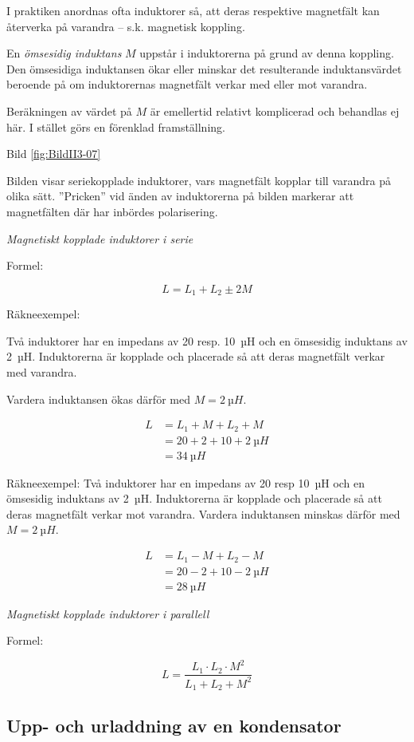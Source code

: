 I praktiken anordnas ofta induktorer så, att deras respektive magnetfält kan
återverka på varandra -- s.k. magnetisk koppling.

En \emph{ömsesidig induktans} \(M\) uppstår i induktorerna på grund av denna
koppling. Den ömsesidiga induktansen ökar eller minskar det resulterande
induktansvärdet beroende på om induktorernas magnetfält verkar med eller mot
varandra.

Beräkningen av värdet på \(M\) är emellertid relativt komplicerad och behandlas
ej här. I stället görs en förenklad framställning.

Bild \ref{fig:BildII3-07}

Bilden visar seriekopplade induktorer, vars magnetfält kopplar till varandra på
olika sätt. ''Pricken'' vid änden av induktorerna på bilden markerar att
magnetfälten där har inbördes polarisering.

\emph{Magnetiskt kopplade induktorer i serie}

Formel:

\[L = L_1 +L_2 \pm 2M\]

Räkneexempel:

Två induktorer har en impedans av 20 resp. 10~µH och en ömsesidig induktans av
2~µH. Induktorerna är kopplade och placerade så att deras magnetfält verkar med
varandra.

Vardera induktansen ökas därför med \(M = 2\ µH\).

\begin{align*}
  L &= L_1 + M + L_2 + M \\
  &= 20 + 2 + 10 + 2\ µH \\
  &= 34\ µH
\end{align*}

Räkneexempel:
Två induktorer har en impedans av 20 resp 10~µH och en ömsesidig induktans av
2~µH. Induktorerna är kopplade och placerade så att deras magnetfält verkar mot
varandra. Vardera induktansen minskas därför med \(M = 2\ µH\).

\begin{align*}
  L &= L_1 - M + L_2 - M \\
  & = 20 - 2 + 10 - 2\ µH \\
  &= 28\ µH
\end{align*}

\emph{Magnetiskt kopplade induktorer i parallell}

Formel:

\[L = \frac{L_1 \cdot L_2 \cdot M^2}{L_1 + L_2 + M^2}\]

\subsection{Upp- och urladdning av en kondensator}

